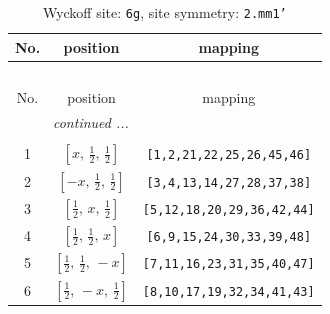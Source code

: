 \documentclass[fleqn,8pt]{jsarticle}
\begin{document}
\renewcommand{\arraystretch}{1.2}
\begin{longtable}{ccc}
\caption{Wyckoff site: {\tt 6g}, site symmetry: {\tt 2.mm1'}}
 \\
 \hline \hline
No. & position & mapping \\ \hline \endfirsthead

\multicolumn{2}{l}{\tablename\ \thetable{}} \\
 \hline \hline
No. & position & mapping \\ \hline \endhead

 \hline \hline
\multicolumn{2}{r}{\footnotesize\it continued ...} \\ \endfoot

 \hline \hline
\multicolumn{2}{r}{} \\ \endlastfoot

1 & $\left[ x,\, \frac{1}{2},\, \frac{1}{2} \right]$ & {\tt [1,2,21,22,25,26,45,46]} \\ \hline
2 & $\left[ - x,\, \frac{1}{2},\, \frac{1}{2} \right]$ & {\tt [3,4,13,14,27,28,37,38]} \\ \hline
3 & $\left[ \frac{1}{2},\, x,\, \frac{1}{2} \right]$ & {\tt [5,12,18,20,29,36,42,44]} \\ \hline
4 & $\left[ \frac{1}{2},\, \frac{1}{2},\, x \right]$ & {\tt [6,9,15,24,30,33,39,48]} \\ \hline
5 & $\left[ \frac{1}{2},\, \frac{1}{2},\, - x \right]$ & {\tt [7,11,16,23,31,35,40,47]} \\ \hline
6 & $\left[ \frac{1}{2},\, - x,\, \frac{1}{2} \right]$ & {\tt [8,10,17,19,32,34,41,43]} \\
\end{longtable}
\renewcommand{\arraystretch}{1.2}
\end{document}
